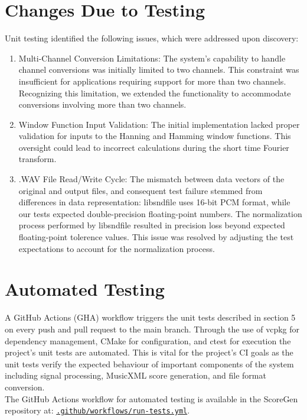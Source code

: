 \documentclass[12pt, titlepage]{article}
\begin{document}
\section{Changes Due to Testing}
Unit testing identified the following issues, which were addressed upon discovery:
\begin{enumerate}
  \item Multi-Channel Conversion Limitations: The system's capability to handle channel conversions was 
  initially limited to two channels. This constraint was insufficient for applications requiring support 
  for more than two channels. Recognizing this limitation, we extended the functionality to accommodate 
  conversions involving more than two channels.
  \item Window Function Input Validation: The initial implementation lacked proper validation for inputs 
  to the Hanning and Hamming window functions. This oversight could lead to incorrect calculations during 
  the short time Fourier transform.
  \item .WAV File Read/Write Cycle: The mismatch between data vectors of the original and output files, and consequent 
  test failure stemmed from differences in data representation: libsndfile uses 16-bit PCM format, while our tests expected 
  double-precision floating-point numbers. The normalization process performed by libsndfile resulted in precision loss beyond
  expected floating-point tolerence values. This issue was resolved by adjusting the test expectations to account for the
  normalization process.
\end{enumerate}



\section{Automated Testing}
A GitHub Actions (GHA) workflow triggers the unit tests described in section 5 on every push and pull request to the main branch. 
Through the use of vcpkg for dependency management, CMake for configuration, and ctest for execution the project's unit tests are 
automated. This is vital for the project's CI goals as the unit tests verify the expected behaviour of important components of the 
system including signal processing, MusicXML score generation, and file format conversion. \\
The GitHub Actions workflow for automated testing is available in the ScoreGen repository at: 
\href{https://github.com/emilyperica/ScoreGen/blob/main/.github/workflows/run-tests.yml}{\texttt{.github/workflows/run-tests.yml}}.
\end{document}
